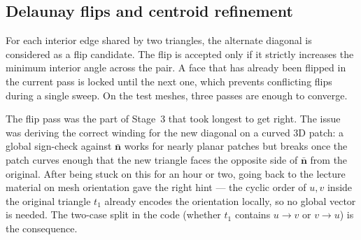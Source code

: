 \subsection*{Delaunay flips and centroid refinement}

For each interior edge shared by two triangles, the alternate diagonal is considered as a flip candidate. The flip is accepted only if it strictly increases the minimum interior angle across the pair. A face that has already been flipped in the current pass is locked until the next one, which prevents conflicting flips during a single sweep. On the test meshes, three passes are enough to converge.

The flip pass was the part of Stage~3 that took longest to get right. The issue was deriving the correct winding for the new diagonal on a curved 3D patch: a global sign-check against $\bar{\mathbf{n}}$ works for nearly planar patches but breaks once the patch curves enough that the new triangle faces the opposite side of $\bar{\mathbf{n}}$ from the original. After being stuck on this for an hour or two, going back to the lecture material on mesh orientation gave the right hint --- the cyclic order of $u, v$ inside the original triangle $t_1$ already encodes the orientation locally, so no global vector is needed. The two-case split in the code (whether $t_1$ contains $u \to v$ or $v \to u$) is the consequence.

